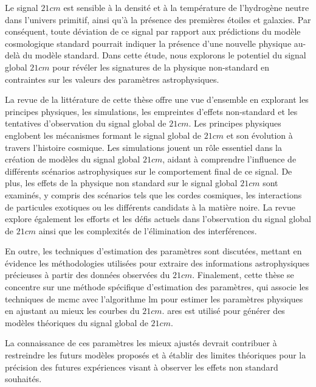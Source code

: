 \documentclass[12pt, TexShade, letterpaper]{report}
\begin{document}
Le signal $21cm$ est sensible à la densité et à la température de l'hydrogène neutre dans l'univers primitif, ainsi qu'à la présence des premières étoiles et galaxies. Par conséquent, toute déviation de ce signal par rapport aux prédictions du modèle cosmologique standard pourrait indiquer la présence d'une nouvelle physique au-delà du modèle standard. Dans cette étude, nous explorons le potentiel du signal global $21cm$ pour révéler les signatures de la physique non-standard en contraintes sur les valeurs des paramètres astrophysiques.\par

La revue de la littérature de cette thèse offre une vue d'ensemble en explorant les principes physiques, les simulations, les empreintes d'effets non-standard et les tentatives d'observation du signal global de $21cm$. Les principes physiques englobent les mécanismes formant le signal global de $21cm$ et son évolution à travers l'histoire cosmique. Les simulations jouent un rôle essentiel dans la création de modèles du signal global $21cm$, aidant à comprendre l'influence de différents scénarios astrophysiques sur le comportement final de ce signal. De plus, les effets de la physique non standard sur le signal global $21cm$ sont examinés, y compris des scénarios tels que les cordes cosmiques, les interactions de particules exotiques ou les différents candidats à la matière noire. La revue explore également les efforts et les défis actuels dans l'observation du signal global de $21cm$ ainsi que les complexités de l'élimination des interférences.\par

En outre, les techniques d'estimation des paramètres sont discutées, mettant en évidence les méthodologies utilisées pour extraire des informations astrophysiques précieuses à partir des données observées du $21cm$. Finalement, cette thèse se concentre sur une méthode spécifique d'estimation des paramètres, qui associe les techniques de \gls{mcmc} avec l'algorithme \gls{lm} pour estimer les paramètres physiques en ajustant au mieux les courbes du $21cm$. \gls{ares} est utilisé pour générer des modèles théoriques du signal global de $21cm$.\par

La connaissance de ces paramètres les mieux ajustés devrait contribuer à restreindre les futurs modèles proposés et à établir des limites théoriques pour la précision des futures expériences visant à observer les effets non standard souhaités.\par
\end{document}
